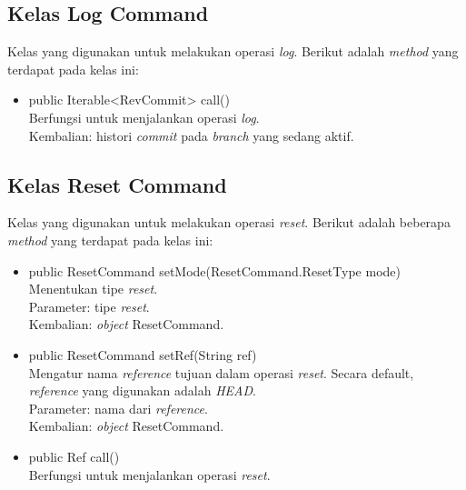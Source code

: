 \subsection{Kelas Log Command}
\label{subsec:logcommand}
Kelas yang digunakan untuk melakukan operasi \textit{log}.
Berikut adalah \textit{method} yang terdapat pada kelas ini:
\begin{itemize}
\item public Iterable<RevCommit> call()\\
Berfungsi untuk menjalankan operasi \textit{log}.\\
Kembalian: histori \textit{commit} pada \textit{branch} yang sedang aktif. 
\end{itemize}

\subsection{Kelas Reset Command}
\label{subsec:resetcommand}
Kelas yang digunakan untuk melakukan operasi \textit{reset}.
Berikut adalah beberapa \textit{method} yang terdapat pada kelas ini:
\begin{itemize}
\item public ResetCommand setMode(ResetCommand.ResetType mode)\\
Menentukan tipe \textit{reset}.\\ 
Parameter: tipe \textit{reset}.\\
Kembalian: \textit{object} ResetCommand.
\item public ResetCommand setRef(String ref)\\
Mengatur nama \textit{reference} tujuan dalam operasi \textit{reset}. Secara default, \textit{reference} yang digunakan adalah \textit{HEAD}.\\
Parameter: nama dari \textit{reference}.\\
Kembalian: \textit{object} ResetCommand.
\item public Ref call()\\
Berfungsi untuk menjalankan operasi \textit{reset}.\\
\end{itemize}

